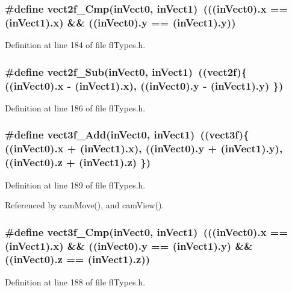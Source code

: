 \subsubsection{\setlength{\rightskip}{0pt plus 5cm}\#define vect2f\_\-Cmp(in\-Vect0, in\-Vect1)~(((in\-Vect0).x == (in\-Vect1).x) \&\& ((in\-Vect0).y == (in\-Vect1).y))}\label{flTypes_8h_0755d7c21f77570367a26245f5cb0898}




Definition at line 184 of file fl\-Types.h.
\subsubsection{\setlength{\rightskip}{0pt plus 5cm}\#define vect2f\_\-Sub(in\-Vect0, in\-Vect1)~(({\bf vect2f})\{ ((in\-Vect0).x - (in\-Vect1).x), ((in\-Vect0).y - (in\-Vect1).y) \})}\label{flTypes_8h_ab6c45c5df17a9a18f4187031046e82c}




Definition at line 186 of file fl\-Types.h.
\subsubsection{\setlength{\rightskip}{0pt plus 5cm}\#define vect3f\_\-Add(in\-Vect0, in\-Vect1)~(({\bf vect3f})\{ ((in\-Vect0).x + (in\-Vect1).x), ((in\-Vect0).y + (in\-Vect1).y), ((in\-Vect0).z + (in\-Vect1).z) \})}\label{flTypes_8h_84108eba3fe297a1cf5acf286aea7682}




Definition at line 189 of file fl\-Types.h.

Referenced by cam\-Move(), and cam\-View().
\subsubsection{\setlength{\rightskip}{0pt plus 5cm}\#define vect3f\_\-Cmp(in\-Vect0, in\-Vect1)~(((in\-Vect0).x == (in\-Vect1).x) \&\& ((in\-Vect0).y == (in\-Vect1).y) \&\& ((in\-Vect0).z == (in\-Vect1).z))}\label{flTypes_8h_7ae34799dd290cad53e221456a5ff6e3}




Definition at line 188 of file fl\-Types.h.

